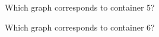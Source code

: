 \documentclass{ximera}
\begin{document}
\begin{exercise}
Which graph corresponds to container 5?
\begin{multipleChoice}
\end{multipleChoice}


Which graph corresponds to container 6?
\begin{multipleChoice}
\end{multipleChoice}

\end{exercise}
\end{document}

